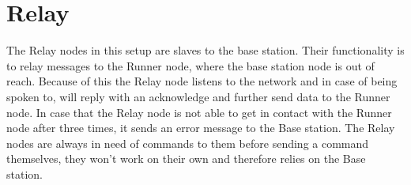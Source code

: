\section{Relay}\label{sc:relay}
The Relay nodes in this setup are slaves to the base station. Their functionality is to relay messages to the Runner node, where the base station node is out of reach. Because of this the Relay node listens to the network and in case of being spoken to, will reply with an acknowledge and further send data to the Runner node. In case that the Relay node is not able to get in contact with the Runner node after three times, it sends an error message to the Base station. The Relay nodes are always in need of commands to them before sending a command themselves, they won't work on their own and therefore relies on the Base station.